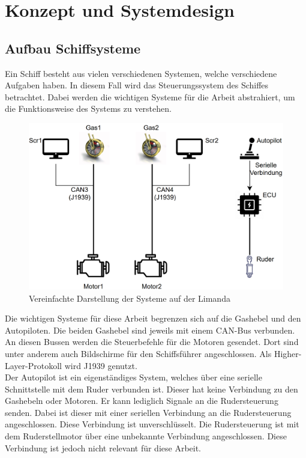 \chapter{Konzept und Systemdesign}

\section{Aufbau Schiffsysteme}
Ein Schiff besteht aus vielen verschiedenen Systemen, welche verschiedene Aufgaben haben. In diesem Fall wird das
Steuerungssystem des Schiffes betrachtet. Dabei werden die wichtigen Systeme für die Arbeit abstrahiert, um die
Funktionsweise des Systems zu verstehen.
\begin{figure}[H]
    \centering
    \includegraphics[scale=0.3]{images/limandaSystem.png}
    \caption{Vereinfachte Darstellung der Systeme auf der Limanda}
\end{figure}
Die wichtigen Systeme für diese Arbeit begrenzen sich auf die Gashebel und den Autopiloten. Die beiden Gashebel sind jeweils
mit einem CAN-Bus verbunden. An diesen Bussen werden die Steuerbefehle für die Motoren gesendet. Dort sind unter anderem 
auch Bildschirme für den Schiffsführer angeschlossen. Als Higher-Layer-Protokoll wird J1939 genutzt. \\
Der Autopilot ist ein eigenständiges System, welches über eine serielle Schnittstelle mit dem Ruder verbunden ist.
Dieser hat keine Verbindung zu den Gashebeln oder Motoren. Er kann lediglich Signale an die Rudersteuerung senden.
Dabei ist dieser mit einer seriellen Verbindung an die Rudersteuerung angeschlossen. Diese Verbindung ist unverschlüsselt.
Die Rudersteuerung ist mit dem Ruderstellmotor über eine unbekannte Verbindung angeschlossen. Diese Verbindung ist
jedoch nicht relevant für diese Arbeit.\\




